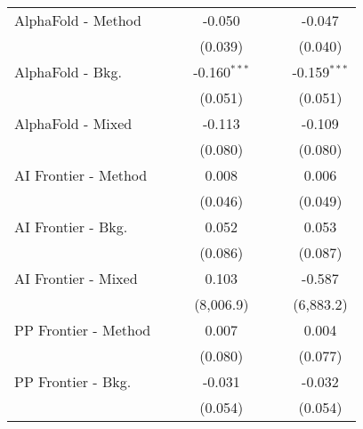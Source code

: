 \begin{tabular}{lcccccc}
   AlphaFold - Method           &                &               & -0.050         &                &              & -0.047\\   
                                &                &               & (0.039)        &                &              & (0.040)\\   
   AlphaFold - Bkg.             &                &               & -0.160$^{***}$ &                &              & -0.159$^{***}$\\   
                                &                &               & (0.051)        &                &              & (0.051)\\   
   AlphaFold - Mixed            &                &               & -0.113         &                &              & -0.109\\   
                                &                &               & (0.080)        &                &              & (0.080)\\   
   AI Frontier - Method         &                &               & 0.008          &                &              & 0.006\\   
                                &                &               & (0.046)        &                &              & (0.049)\\   
   AI Frontier - Bkg.           &                &               & 0.052          &                &              & 0.053\\   
                                &                &               & (0.086)        &                &              & (0.087)\\   
   AI Frontier - Mixed          &                &               & 0.103          &                &              & -0.587\\   
                                &                &               & (8,006.9)      &                &              & (6,883.2)\\   
   PP Frontier - Method         &                &               & 0.007          &                &              & 0.004\\   
                                &                &               & (0.080)        &                &              & (0.077)\\   
   PP Frontier - Bkg.           &                &               & -0.031         &                &              & -0.032\\   
                                &                &               & (0.054)        &                &              & (0.054)\\   

\end{tabular}
